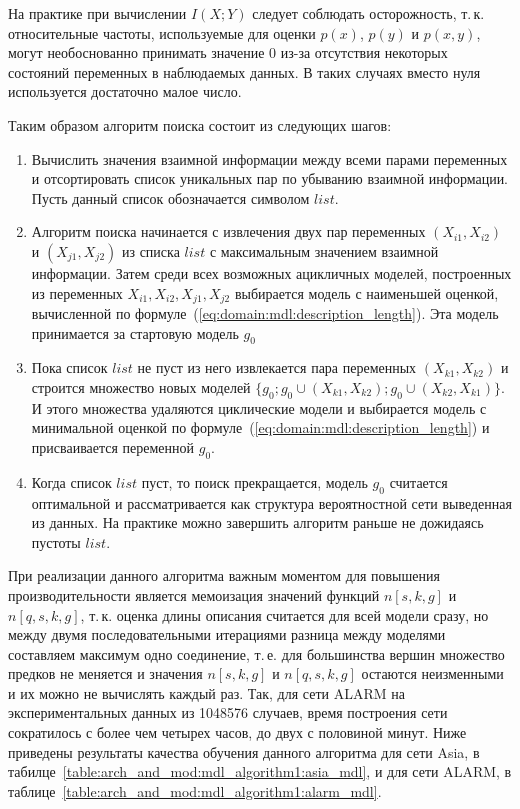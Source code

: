 На практике при вычислении $I(X; Y)$ следует соблюдать осторожность, т.\,к. относительные частоты, используемые для оценки $p(x)$, $p(y)$ и $p(x, y)$, могут необоснованно принимать значение \num{0} из-за отсутствия некоторых состояний переменных в наблюдаемых данных.
В таких случаях вместо нуля используется достаточно малое число.

Таким образом алгоритм поиска состоит из следующих шагов:
\begin{enumerate}
  \item Вычислить значения взаимной информации между всеми парами переменных и отсортировать список уникальных пар по убыванию взаимной информации.
  Пусть данный список обозначается символом $list$.
  \item Алгоритм поиска начинается с извлечения двух пар переменных $(X_{i1}, X_{i2})$ и $(X_{j1}, X_{j2})$ из списка $list$ с максимальным значением взаимной информации.
  Затем среди всех возможных ацикличных моделей, построенных из переменных $ X_{i1}, X_{i2}, X_{j1}, X_{j2} $ выбирается модель с наименьшей оценкой, вычисленной по формуле~(\ref{eq:domain:mdl:description_length}).
  Эта модель принимается за стартовую модель $g_0$
  \item Пока список $list$ не пуст из него извлекается пара переменных $(X_{k1}, X_{k2})$ и строится множество новых моделей $\{g_0; g_0 \cup (X_{k1}, X_{k2}); g_0 \cup (X_{k2}, X_{k1})\} $.
  И этого множества удаляются циклические модели и выбирается модель с минимальной оценкой по формуле~(\ref{eq:domain:mdl:description_length}) и присваивается переменной $g_0$.
  \item Когда список $list$ пуст, то поиск прекращается, модель $g_0$ считается оптимальной и рассматривается как структура вероятностной сети выведенная из данных. 
  На практике можно завершить алгоритм раньше не дожидаясь пустоты $list$.
\end{enumerate}

При реализации данного алгоритма важным моментом для повышения производительности является мемоизация значений функций $n[s, k, g]$ и $n[q, s, k, g]$, т.\,к. оценка длины описания считается для всей модели сразу, но между двумя последовательными итерациями разница между моделями составляем максимум одно соединение, т.\,е. для большинства вершин множество предков не меняется и значения $n[s, k, g]$ и $n[q, s, k, g]$ остаются неизменными и их можно не вычислять каждый раз.
Так, для сети ALARM на экспериментальных данных из \num{1048576} случаев, время построения сети сократилось с более чем четырех часов, до двух с половиной минут.
Ниже приведены результаты качества обучения данного алгоритма для сети Asia, в табилце~\ref{table:arch_and_mod:mdl_algorithm1:asia_mdl}, и для сети ALARM, в таблице~\ref{table:arch_and_mod:mdl_algorithm1:alarm_mdl}.

